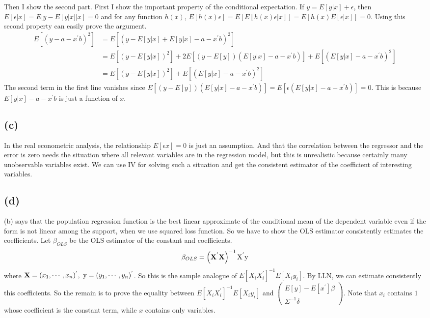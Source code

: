 \documentclass{article}
\begin{document}
Then I show the second part. First I show the important property of the conditional expectation. If $y = E[y|x] + \epsilon$, then $E[\epsilon | x] = E[y - E[y|x] |x] = 0$ and for any function $h(x)$, $E[h(x) \epsilon] = E[E[h(x)\epsilon | x]] = E[h(x)E[\epsilon | x]] = 0$. Using this second property can easily prove the argument.
\begin{align*}
	E[(y - a - x^{'}b)^2] &= E[(y- E[y|x] + E[y|x] -a -x^{'}b)^2] \\[8pt]
	&= E[(y- E[y|x])^2] + 2E[(y - E[y])(E[y|x] -a-x^{'}b)] + E[(E[y|x] - a-x^{'}b)^2]\\[8pt]
	&= E[(y- E[y|x])^2] + E[(E[y|x] - a-x^{'}b)^2]
\end{align*}
The second term in the first line vanishes since $E[(y - E[y])(E[y|x] -a-x^{'}b)] = E[\epsilon(E[y|x] -a-x^{'}b)] = 0$. This is because $E[y|x] -a-x^{'}b$ is just a function of $x$.

\subsection{(c)}
In the real econometric analysis, the relationship $E[\epsilon x] = 0$ is just an assumption. And that the correlation between the regressor and the error is zero needs the situation where all relevant variables are in the regression model, but this is unrealistic because certainly many unobservable variables exist. We can use IV for solving such a situation and get the consistent estimator of the coefficient of interesting variables.

\subsection{(d)}
(b) says that the population regression function is the best linear approximate of the conditional mean of the dependent variable even if the form is not linear among the support, when we use squared loss function. So we have to show the OLS estimator consistently estimates the coefficients.  Let $\beta_{OLS}$ be the OLS estimator of the constant and coefficients.
\begin{align*}
	\beta_{OLS} = \left( {\bf X}^{'}{\bf X} \right)^{-1}{\rm X}^{'} {\rm y}
\end{align*}
where ${\bf X} = (x_1, \cdots, x_n)^{'},\ {\rm y} = (y_1, \cdots, y_n)^{'}$. So this is the sample analogue of $E\left[ X_i X_i^{'} \right]^{-1}E\left[ X_i y_i \right]$. By LLN, we can estimate consistently this coefficients. So the remain is to prove the equality between $E\left[ X_i X_i^{'} \right]^{-1}E\left[ X_i y_i \right]$ and $\left(\begin{array}{cc} E[y] - E[x^{'}]\beta\\ \Sigma^{-1}\delta \end{array}\right)$. Note that $x_i$ contains $1$ whose coefficient is the constant term, while $x$ contains only variables.
\end{document}
